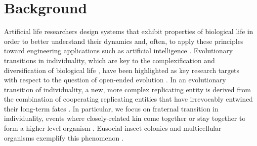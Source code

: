 \section{Background}

Artificial life researchers design systems that exhibit properties of biological life in order to better understand their dynamics and, often, to apply these principles toward engineering applications such as artificial intelligence \cite{bedau2003artificial}.
Evolutionary transitions in individuality, which are key to the complexification and diversification of biological life \cite{smith1997major}, have been highlighted as key research targets with respect to the question of open-ended evolution \cite{ray1996evolving, banzhaf2016defining}.
In an evolutionary transition of individuality, a new, more complex replicating entity is derived from the combination of cooperating replicating entities that have irrevocably entwined their long-term fates \cite{west2015major}.
In particular, we focus on fraternal transition in individuality, events where closely-related kin come together or stay together to form a higher-level organism \cite{queller1997cooperators}.
Eusocial insect colonies and multicellular organisms exemplify this phenomenon \cite{smith1997major}.
